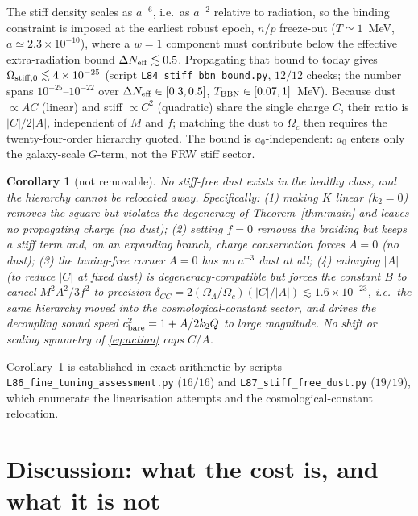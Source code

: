 \documentclass[11pt,letterpaper]{article}
\newtheorem{corollary}{Corollary}
\begin{document}
The stiff density scales as $a^{-6}$, i.e.\ as $a^{-2}$ relative to radiation, so the binding constraint is
imposed at the earliest robust epoch, $n/p$ freeze-out ($T\simeq1$~MeV, $a\simeq2.3\times10^{-10}$), where a
$w=1$ component must contribute below the effective extra-radiation bound $\Delta N_{\rm eff}\lesssim0.5$.
Propagating that bound to today gives $\Omega_{\rm stiff,0}\lesssim4\times10^{-25}$
(script \texttt{L84\_stiff\_bbn\_bound.py}, $12/12$ checks; the number spans $10^{-25}$--$10^{-22}$ over
$\Delta N_{\rm eff}\in[0.3,0.5]$, $T_{\rm BBN}\in[0.07,1]$~MeV). Because dust $\propto AC$ (linear) and stiff
$\propto C^2$ (quadratic) share the single charge $C$, their ratio is $|C|/2|A|$, independent of $M$ and $f$;
matching the dust to $\Omega_c$ then requires the twenty-four-order hierarchy quoted. The bound is
$a_0$-independent: $a_0$ enters only the galaxy-scale $G$-term, not the FRW stiff sector.

\begin{corollary}[not removable]\label{cor:intrinsic}
No stiff-free dust exists in the healthy class, and the hierarchy cannot be relocated away. Specifically:
\emph{(1)} making $K$ linear ($k_2=0$) removes the square but violates the degeneracy of Theorem~\ref{thm:main}
and leaves no propagating charge (no dust); \emph{(2)} setting $f=0$ removes the braiding but keeps a stiff
term and, on an expanding branch, charge conservation forces $A=0$ (no dust); \emph{(3)} the tuning-free
corner $A=0$ has no $a^{-3}$ dust at all; \emph{(4)} enlarging $|A|$ (to reduce $|C|$ at fixed dust) is
degeneracy-compatible but forces the constant $B$ to cancel $M^2A^2/3f^2$ to precision
$\delta_{CC}=2(\Omega_\Lambda/\Omega_c)(|C|/|A|)\lesssim1.6\times10^{-23}$, i.e.\ the same hierarchy moved
into the cosmological-constant sector, and drives the decoupling sound speed $c_{\rm bare}^2=1+A/2k_2Q$ to
large magnitude. No shift or scaling symmetry of \eqref{eq:action} caps $C/A$.
\end{corollary}

Corollary~\ref{cor:intrinsic} is established in exact arithmetic by scripts
\texttt{L86\_fine\_tuning\_assessment.py} ($16/16$) and \texttt{L87\_stiff\_free\_dust.py} ($19/19$), which
enumerate the linearisation attempts and the cosmological-constant relocation.

\section{Discussion: what the cost is, and what it is not}
\end{document}
